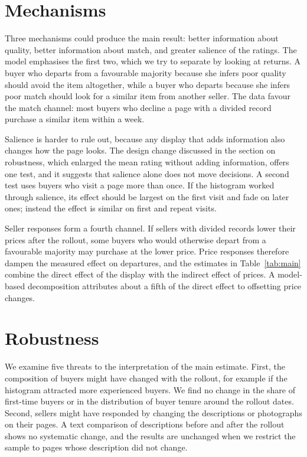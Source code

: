 \documentclass[12pt]{article}
\begin{document}
\section{Mechanisms}
Three mechanisms could produce the main result: better information about quality, better information about match, and greater salience of the ratings. The model emphasises the first two, which we try to separate by looking at returns. A buyer who departs from a favourable majority because she infers poor quality should avoid the item altogether, while a buyer who departs because she infers poor match should look for a similar item from another seller. The data favour the match channel: most buyers who decline a page with a divided record purchase a similar item within a week.

Salience is harder to rule out, because any display that adds information also changes how the page looks. The design change discussed in the section on robustness, which enlarged the mean rating without adding information, offers one test, and it suggests that salience alone does not move decisions. A second test uses buyers who visit a page more than once. If the histogram worked through salience, its effect should be largest on the first visit and fade on later ones; instead the effect is similar on first and repeat visits.

Seller responses form a fourth channel. If sellers with divided records lower their prices after the rollout, some buyers who would otherwise depart from a favourable majority may purchase at the lower price. Price responses therefore dampen the measured effect on departures, and the estimates in Table~\ref{tab:main} combine the direct effect of the display with the indirect effect of prices. A model-based decomposition attributes about a fifth of the direct effect to offsetting price changes.

\section{Robustness}
We examine five threats to the interpretation of the main estimate. First, the composition of buyers might have changed with the rollout, for example if the histogram attracted more experienced buyers. We find no change in the share of first-time buyers or in the distribution of buyer tenure around the rollout dates. Second, sellers might have responded by changing the descriptions or photographs on their pages. A text comparison of descriptions before and after the rollout shows no systematic change, and the results are unchanged when we restrict the sample to pages whose description did not change.
\end{document}
